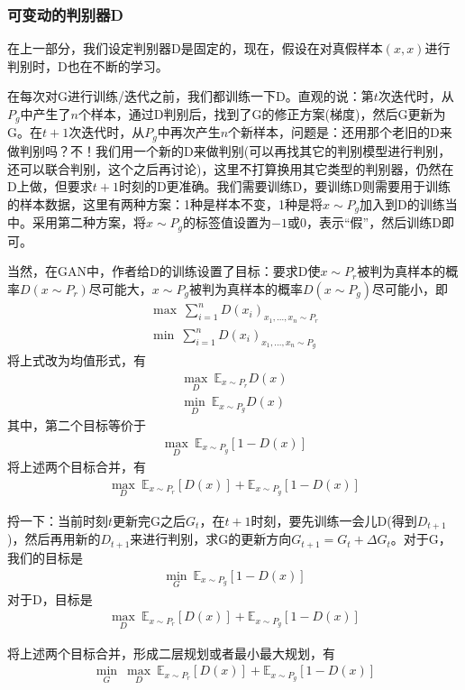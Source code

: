         \subsubsection{可变动的判别器D}
            \par
            在上一部分，我们设定判别器D是固定的，现在，假设在对真假样本$(x,x)$进行判别时，D也在不断的学习。
            \par
            在每次对G进行训练/迭代之前，我们都训练一下D。直观的说：第$t$次迭代时，从$P_g$中产生了$n$个样本，通过D判别后，找到了G的修正方案(梯度)，然后G更新为G。在$t+1$次迭代时，从$P_g$中再次产生$n$个新样本，问题是：还用那个老旧的D来做判别吗？不！我们用一个新的D来做判别(可以再找其它的判别模型进行判别，还可以联合判别，这个之后再讨论)，这里不打算换用其它类型的判别器，仍然在D上做，但要求$t+1$时刻的D更准确。我们需要训练D，要训练D则需要用于训练的样本数据，这里有两种方案：1种是样本不变，1种是将$x\sim P_g$加入到D的训练当中。采用第二种方案，将$x\sim P_g$的标签值设置为$-1$或$0$，表示“假”，然后训练D即可。
            \par
            当然，在GAN中，作者给D的训练设置了目标：要求D使$x\sim P_r$被判为真样本的概率$D(x\sim P_r)$尽可能大，$x\sim P_g$被判为真样本的概率$D(x\sim P_g)$尽可能小，即
            \begin{align*}
            \max \ \sum_{i=1}^n D(x_i)_{x_1,\dots,x_n\sim P_r}\\
            \min \ \sum_{i=1}^n D(x_i)_{x_1,\dots,x_n\sim P_g}
            \end{align*}
            将上式改为均值形式，有
            \begin{align*}
            \max_D\ \mathbb{E}_{x\sim P_r} D(x)\\
            \min_D\ \mathbb{E}_{x\sim P_g} D(x)
            \end{align*}
            其中，第二个目标等价于
            \begin{align*}
            \max_D\ \mathbb{E}_{x\sim P_g}[1-D(x)]
            \end{align*}
            将上述两个目标合并，有
            \begin{align*}
            \max _D\ \mathbb{E}_{x\sim P_r}[D(x)] + \mathbb{E}_{x\sim P_g}[1-D(x)]
            \end{align*}
            \par
            捋一下：当前时刻$t$更新完G之后$G_t$，在$t+1$时刻，要先训练一会儿D(得到$D_{t+1}$)，然后再用新的$D_{t+1}$来进行判别，求G的更新方向$G_{t+1} = G_t+\Delta G_t$。对于G，我们的目标是
            \begin{align*}
            \min_G\ \mathbb{E}_{x\sim P_g}[1-D(x)]
            \end{align*}
            对于D，目标是
            \begin{align*}
            \max_D\ \mathbb{E}_{x\sim P_r}[D(x)]+\mathbb{E}_{x\sim P_g}[1-D(x)]
            \end{align*}
            \par
            将上述两个目标合并，形成二层规划或者最小最大规划，有
            \begin{align}
            \label{GAN模型1}
            \min_G\ \max_D\ \mathbb{E}_{x\sim P_r}[D(x)]+\mathbb{E}_{x\sim P_g}[1-D(x)]
            \end{align}

